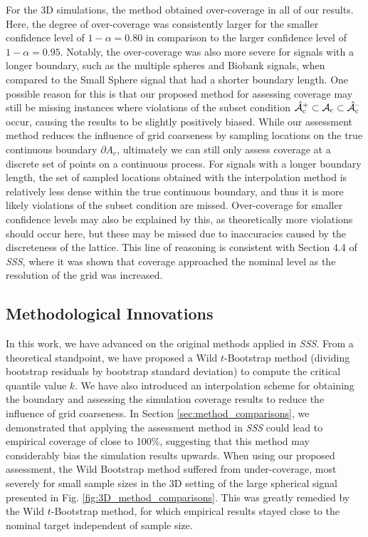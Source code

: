 For the 3D simulations, the method obtained over-coverage in all of our results. Here, the degree of over-coverage was consistently larger for the smaller confidence level of $1 - \alpha = 0.80$ in comparison to the larger confidence level of $1- \alpha = 0.95$. Notably, the over-coverage was also more severe for signals with a longer boundary, such as the multiple spheres and Biobank signals, when compared to the Small Sphere signal that had a shorter boundary length. One possible reason for this is that our proposed method for assessing coverage may still be missing instances where violations of the subset condition $\operatorname{\hat{\mathcal{A}}_{c}^+} \subset \operatorname{\mathcal{A}_{c}} \subset \operatorname{\hat{\mathcal{A}}_{c}^{\textrm{--}}}$ occur, causing the results to be slightly positively biased. While our assessment method reduces the influence of grid coarseness by sampling locations on the true continuous boundary $\partial A_c$, ultimately we can still only assess coverage at a discrete set of points on a continuous process. For signals with a longer boundary length, the set of sampled locations obtained with the interpolation method is relatively less dense within the true continuous boundary, and thus it is more likely violations of the subset condition are missed. Over-coverage for smaller confidence levels may also be explained by this, as theoretically more violations should occur here, but these may be missed due to inaccuracies caused by the discreteness of the lattice. This line of reasoning is consistent with Section 4.4 of \textit{SSS}, where it was shown that coverage approached the nominal level as the resolution of the grid was increased.

\subsection{Methodological Innovations}
\label{sec:discussion_innovations}
In this work, we have advanced on the original methods applied in \textit{SSS}. From a theoretical standpoint, we have proposed a Wild $t$-Bootstrap method (dividing bootstrap residuals by bootstrap standard deviation) to compute the critical quantile value $k$. We have also introduced an interpolation scheme for obtaining the boundary and assessing the simulation coverage results to reduce the influence of grid coarseness. In Section \ref{sec:method_comparisons}, we demonstrated that applying the assessment method in \textit{SSS} could lead to empirical coverage of close to 100\%, suggesting that this method may considerably bias the simulation results upwards. When using our proposed assessment, the Wild Bootstrap method suffered from under-coverage, most severely for small sample sizes in the 3D setting of the large spherical signal presented in Fig. \ref{fig:3D_method_comparisons}. This was greatly remedied by the Wild $t$-Bootstrap method, for which empirical results stayed close to the nominal target independent of sample size.

